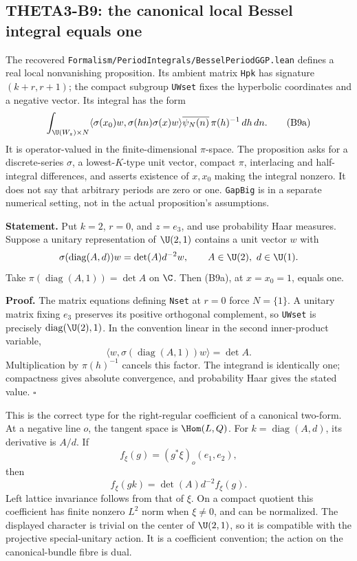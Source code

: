 \subsection{THETA3-B9: the canonical local Bessel integral equals one}\label{B9}

The recovered \texttt{Formalism/\allowbreak{}PeriodIntegrals/\allowbreak{}BesselPeriodGGP.lean} defines a real local nonvanishing proposition. Its ambient matrix \texttt{Hpk} has signature $(k+r,r+1)$; the compact subgroup \texttt{UWset} fixes the hyperbolic coordinates and a negative vector. Its integral has the form
\[
 \int_{\U(W_z)\times N}
 \langle\sigma(x_0)w,\sigma(hn)\sigma(x)w\rangle
       \overline{\psi_N(n)}\,\pi(h)^{-1}\,dh\,dn.
 \tag{B9a}
\]
It is operator-valued in the finite-dimensional $\pi$-space. The proposition asks for a discrete-series $\sigma$, a lowest-$K$-type unit vector, compact $\pi$, interlacing and half-integral differences, and asserts existence of $x,x_0$ making the integral nonzero. It does not say that arbitrary periods are zero or one. \texttt{GapBig} is in a separate numerical setting, not in the actual proposition's assumptions.

\textbf{Statement.} Put $k=2$, $r=0$, and $z=e_3$, and use probability Haar measures. Suppose a unitary representation of $\U(2,1)$ contains a unit vector $w$ with
\[
 \sigma(\operatorname{diag}(A,d))w=\det(A)d^{-2}w,
 \qquad A\in\U(2),\ d\in\U(1).
\]
Take $\pi(\operatorname{diag}(A,1))=\det A$ on $\C$. Then (B9a), at $x=x_0=1$, equals one.

\textbf{Proof.} The matrix equations defining \texttt{Nset} at $r=0$ force $N=\{1\}$. A unitary matrix fixing $e_3$ preserves its positive orthogonal complement, so \texttt{UWset} is precisely $\operatorname{diag}(\U(2),1)$. In the convention linear in the second inner-product variable,
\[
 \langle w,\sigma(\operatorname{diag}(A,1))w\rangle=\det A.
\]
Multiplication by $\pi(h)^{-1}$ cancels this factor. The integrand is identically one; compactness gives absolute convergence, and probability Haar gives the stated value. \hfill$\square$

This is the correct type for the right-regular coefficient of a canonical two-form. At a negative line $o$, the tangent space is $\Hom(L,Q)$. For $k=\operatorname{diag}(A,d)$, its derivative is $A/d$. If
\[
 f_\xi(g)=(g^*\xi)_o(e_1,e_2),
\]
then
\[
 f_\xi(gk)=\det(A)d^{-2}f_\xi(g).
\]
Left lattice invariance follows from that of $\xi$. On a compact quotient this coefficient has finite nonzero $L^2$ norm when $\xi\ne0$, and can be normalized. The displayed character is trivial on the center of $\U(2,1)$, so it is compatible with the projective special-unitary action. It is a coefficient convention; the action on the canonical-bundle fibre is dual.

